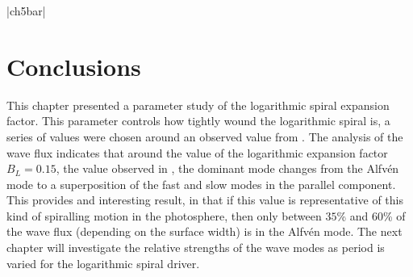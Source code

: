 \py[chapter5]|ch5bar|

\section{Conclusions}

This chapter presented a parameter study of the logarithmic spiral expansion factor.
This parameter controls how tightly wound the logarithmic spiral is, a series of values were chosen around an observed value from \cite{bonet2008}.
The analysis of the wave flux indicates that around the value of the logarithmic expansion factor $B_L=0.15$, the value observed in \cite{bonet2008}, the dominant mode changes from the Alfv\'en mode to a superposition of the fast and slow modes in the parallel component.
This provides and interesting result, in that if this value is representative of this kind of spiralling motion in the photosphere, then only between $35$\% and $60$\% of the wave flux (depending on the surface width) is in the Alfv\'en mode.
The next chapter will investigate the relative strengths of the wave modes as period is varied for the logarithmic spiral driver.


